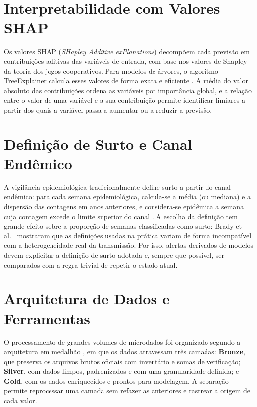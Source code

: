 \section{Interpretabilidade com Valores SHAP}

Os valores SHAP (\textit{SHapley Additive exPlanations}) \cite{lundberg2017unified} decompõem cada previsão em contribuições aditivas das variáveis de entrada, com base nos valores de Shapley da teoria dos jogos cooperativos. Para modelos de árvores, o algoritmo TreeExplainer calcula esses valores de forma exata e eficiente \cite{lundberg2020local}. A média do valor absoluto das contribuições ordena as variáveis por importância global, e a relação entre o valor de uma variável e a sua contribuição permite identificar limiares a partir dos quais a variável passa a aumentar ou a reduzir a previsão.

\section{Definição de Surto e Canal Endêmico}
\label{sec:ref_canal_endemico}

A vigilância epidemiológica tradicionalmente define surto a partir do canal endêmico: para cada semana epidemiológica, calcula-se a média (ou mediana) e a dispersão das contagens em anos anteriores, e considera-se epidêmica a semana cuja contagem excede o limite superior do canal \cite{bortman1999canal}. A escolha da definição tem grande efeito sobre a proporção de semanas classificadas como surto: Brady et al.~\cite{brady2015outbreak} mostraram que as definições usadas na prática variam de forma incompatível com a heterogeneidade real da transmissão. Por isso, alertas derivados de modelos devem explicitar a definição de surto adotada e, sempre que possível, ser comparados com a regra trivial de repetir o estado atual.

\section{Arquitetura de Dados e Ferramentas}

O processamento de grandes volumes de microdados foi organizado segundo a arquitetura em medalhão \cite{databricks2024medallion}, em que os dados atravessam três camadas: \textbf{Bronze}, que preserva os arquivos brutos oficiais com inventário e somas de verificação; \textbf{Silver}, com dados limpos, padronizados e com uma granularidade definida; e \textbf{Gold}, com os dados enriquecidos e prontos para modelagem. A separação permite reprocessar uma camada sem refazer as anteriores e rastrear a origem de cada valor.

